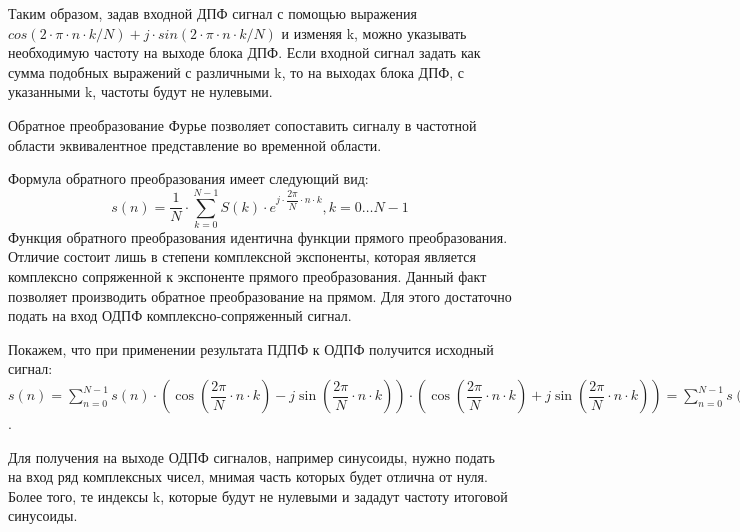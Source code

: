 Таким образом, задав входной ДПФ сигнал с помощью выражения \(cos(2 \cdot \pi \cdot n \cdot k / N) + j \cdot sin(2 \cdot \pi \cdot n \cdot k / N) \) и изменяя k, можно указывать необходимую частоту на
выходе блока ДПФ. Если входной сигнал задать как сумма подобных выражений с различными k, то на выходах
блока ДПФ, с указанными k, частоты будут не нулевыми.

Обратное преобразование Фурье позволяет сопоставить сигналу в частотной области эквивалентное представление во временной области.

Формула обратного преобразования имеет следующий вид:
\begin{equation}
s(n) = \dfrac{1}{N}\cdot \sum_{k=0}^{N-1} S(k) \cdot e^{j \cdot \dfrac{2\pi}{N} \cdot n \cdot k}, k = 0 \dots N-1
\end{equation}
Функция обратного преобразования идентична функции прямого преобразования. Отличие состоит лишь в
степени комплексной экспоненты, которая является комплексно сопряженной к экспоненте прямого
преобразования. Данный факт позволяет производить обратное преобразование на прямом. Для этого
достаточно подать на вход ОДПФ комплексно-сопряженный сигнал.

Покажем, что при применении результата ПДПФ к ОДПФ получится исходный сигнал:\newline
\(s(n) = \sum_{n = 0}^{N -1} s(n) \cdot (\cos(\dfrac{2\pi}{N} \cdot n \cdot k) - j \sin(\dfrac{2\pi}{N}
\cdot n \cdot k)) \cdot (\cos(\dfrac{2\pi}{N} \cdot n \cdot k) + j \sin(\dfrac{2\pi}{N} \cdot n \cdot
k)) = \sum_{n = 0}^{N -1} s(n) \cdot \cos^2(\dfrac{2\pi}{N} \cdot n \cdot k) - j^2 \cdot
\sin^2(\dfrac{2\pi}{N} \cdot n \cdot k)) = \sum_{n = 0}^{N -1} s(n) \cdot 1\).

Для получения на выходе ОДПФ сигналов, например синусоиды, нужно подать на вход ряд
комплексных чисел, мнимая часть которых будет отлична от нуля. Более того, те индексы k, которые будут
не нулевыми и зададут частоту итоговой синусоиды.

\newpage